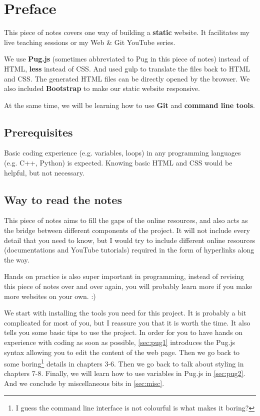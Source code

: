\chapter*{Preface}

This piece of notes covers one way of building a \textbf{static} website. It facilitates my live teaching sessions or my Web \& Git YouTube series.
\vspace{6mm}

We use \textbf{Pug.js} (sometimes abbreviated to Pug in this piece of notes) instead of HTML, \textbf{less} instead of CSS. And used gulp to translate the files back to HTML and CSS. The generated HTML files can be directly opened by the browser. We also included \textbf{Bootstrap} to make our static website responsive.
\vspace{6mm}

At the same time, we will be learning how to use \textbf{Git} and \textbf{command line tools}.

\section{Prerequisites}

Basic coding experience (e.g. variables, loops) in any programming languages (e.g. C++, Python) is expected. Knowing basic HTML and CSS would be helpful, but not necessary. 

\section{Way to read the notes}

This piece of notes aims to fill the gaps of the online resources, and also acts as the bridge between different components of the project. It will not include every detail that you need to know, but I would try to include different online resources (documentations and YouTube tutorials) required in the form of hyperlinks along the way.
\vspace{6mm}

Hands on practice is also super important in programming, instead of revising this piece of notes over and over again, you will probably learn more if you make more websites on your own. :)
\vspace{6mm}

We start with installing the tools you need for this project. It is probably a bit complicated for most of you, but I reassure you that it is worth the time. It also tells you some basic tips to use the project. In order for you to have hands on experience with coding as soon as possible, \cref{sec:pug1} introduces the Pug.js syntax allowing you to edit the content of the web page. Then we go back to some boring\footnote{I guess the command line interface is not colourful is what makes it boring?} details in chapters 3-6. Then we go back to talk about styling in chapters 7-8. Finally, we will learn how to use variables in Pug.js in \cref{sec:pug2}. And we conclude by miscellaneous bits in \cref{sec:misc}.
\vspace{6mm}

